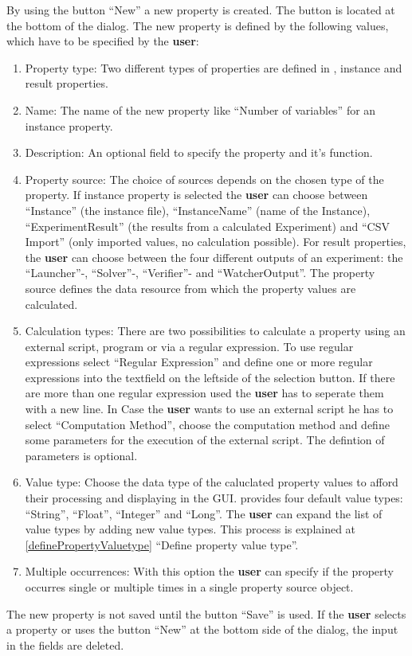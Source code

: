 By using the button ``New'' a new property is created. The button is located at the bottom of the dialog. The new property  is defined by the following values, which have to be specified by the \textbf{user}:
\begin{enumerate}
	\item Property type: Two different types of properties are defined in \edacc, instance and result properties. 
	\item Name: The name of the new property like ``Number of variables'' for an instance property.
	\item Description: An optional field to specify the property and it's function.
	\item Property source: The choice of sources depends on the chosen type of the property. If instance property is selected the \textbf{user} can choose between ``Instance'' (the instance file), ``InstanceName'' (name of the Instance), ``ExperimentResult'' (the results from a calculated Experiment) and ``CSV Import'' (only imported values, no calculation possible). For result properties, the \textbf{user} can choose between the four different outputs of an experiment: the ``Launcher''-, ``Solver''-, ``Verifier''- and ``WatcherOutput''. The property source defines the data resource from which the property values are calculated. 
	\item Calculation types: There are two possibilities to calculate a property using an external script, program or via a regular expression. To use regular expressions select ``Regular Expression'' and define one or more regular expressions into the textfield on the leftside of the selection button. If there are more than one regular expression used the \textbf{user} has to seperate them with a new line. In Case the \textbf{user} wants to use an external script he has to select ``Computation Method'', choose the computation method and define some parameters for the execution of the external script. \attention The defintion of parameters is optional.
	\item Value type: Choose the data type of the caluclated property values to afford their processing and displaying in the GUI. \edacc provides four default value types: ``String'', ``Float'', ``Integer'' and ``Long''. The \textbf{user} can expand the list of value types by adding new value types. This process is  explained at \ref{definePropertyValuetype} ``Define property value type''. 
	\item Multiple occurrences: With this option the \textbf{user} can specify if the property occurres single or multiple times in a single property source object. 
\end{enumerate} 
\attention The new property is not saved until the button ``Save'' is used. If the \textbf{user} selects a property or uses the button ``New'' at the bottom side of the dialog, the input in the fields are deleted. 


